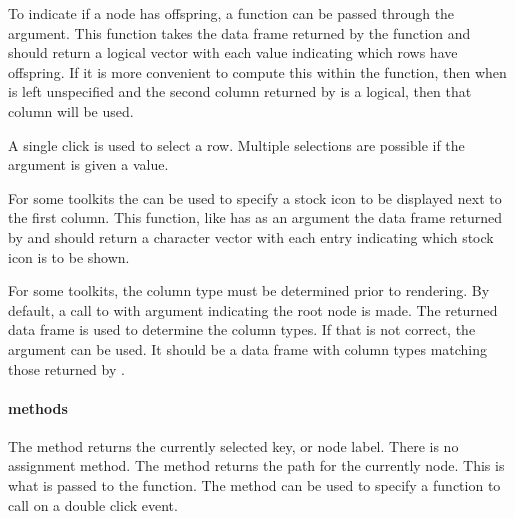 To indicate if a node has offspring, a function can be passed through
the  argument. This function takes the
data frame returned by the  function and should return
a logical vector with each value indicating which rows have
offspring. If it is more convenient to compute this within the
 function, then when  is left
unspecified and the second column returned by  is a
logical, then that column will be used.

A single click is used to select a row. Multiple selections are
possible if the  argument is given a
 value.

For some toolkits the  can be used to
specify a stock icon to be displayed next to the first column. This
function, like  has as an argument the data frame
returned by  and should return a character vector with
each entry indicating which stock icon is to be shown.

For some toolkits, the column type must be determined prior to
rendering. By default, a call to  with argument
 indicating the root node is made. The returned data frame
is used to determine the column types. If that is not correct, the
argument  can be used. It should be a data
frame with column types matching those returned by .

\paragraph{methods}
The  method returns the currently selected key, or node label. There is no assignment method. The \method{[}{gtree} method returns the path for the currently node. This is what is passed to the  function. The method  can be used to specify a function to call on a double click event.

